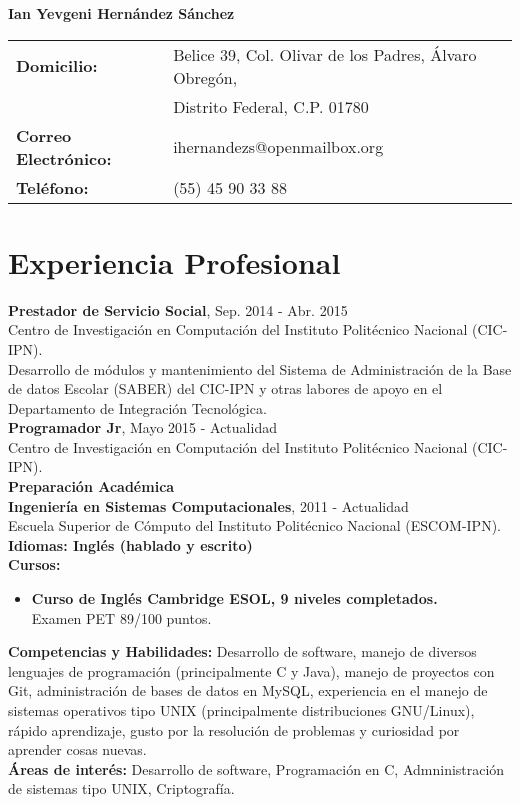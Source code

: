 \documentclass[12pt, letterpaper, oneside]{report}
\begin{document}
	\centering\Large\textbf{Ian Yevgeni Hernández Sánchez} \\[7mm]
	\justify\normalsize
	\begin{tabular}{l l}
	\textbf{Domicilio:} & Belice 39, Col. Olivar de los Padres, Álvaro Obregón, \\
	 & Distrito Federal, C.P. 01780 \\[2mm]
	\textbf{Correo Electrónico:} & ihernandezs@openmailbox.org \\[2mm]
	\textbf{Teléfono:} & (55) 45 90 33 88 \\[7mm]
	\end{tabular}

	\section{Experiencia Profesional}
	\justify
	\textbf{Prestador de Servicio Social}, Sep. 2014 - Abr. 2015 \\
	Centro de Investigación en Computación del Instituto Politécnico Nacional 
	(CIC-IPN). \\[2mm]
	Desarrollo de módulos y mantenimiento del Sistema de Administración de la 
	Base de datos Escolar (SABER) del CIC-IPN y otras labores de apoyo en el 
	Departamento de Integración Tecnológica. \\[5mm]
	\textbf{Programador Jr}, Mayo 2015 - Actualidad \\
	Centro de Investigación en Computación del Instituto Politécnico Nacional 
	(CIC-IPN). \\[5mm]

	\centering\textbf{Preparación Académica} \\
	\justify
	\textbf{Ingeniería en Sistemas Computacionales}, 2011 - Actualidad \\
	Escuela Superior de Cómputo del Instituto Politécnico Nacional 
	(ESCOM-IPN). \\[5mm]
	\textbf{Idiomas: Inglés (hablado y escrito)} \\[5mm]
	\textbf{Cursos:}
	\begin{itemize}
		\item \textbf{Curso de Inglés Cambridge ESOL, 9 niveles completados.} \\
		Examen PET 89/100 puntos.
	\end{itemize}
	\textbf{Competencias y Habilidades:} 
	Desarrollo de software, manejo de diversos lenguajes de programación 
	(principalmente C y Java), manejo de proyectos con Git, administración de 
	bases de datos en MySQL, experiencia en el manejo de sistemas operativos 
	tipo UNIX (principalmente distribuciones GNU/Linux), rápido aprendizaje, 
	gusto por la resolución de problemas y curiosidad por aprender cosas nuevas. \\[5mm]
	\textbf{Áreas de interés:} Desarrollo de software, Programación en C, 
	Admninistración de sistemas tipo UNIX, Criptografía.
\end{document}
